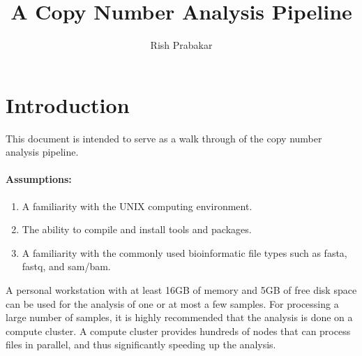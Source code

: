 \documentclass[11pt]{article}
\title{A Copy Number Analysis Pipeline}
\author{Rish Prabakar}
\begin{document}
\maketitle

\section{Introduction}
This document is intended to serve as a walk through of the copy number
analysis pipeline.

\paragraph{Assumptions:}
\begin{enumerate}
  \item A familiarity with the UNIX computing environment.
  \item The ability to compile and install tools and packages.
  \item A familiarity with the commonly used bioinformatic file types such
    as fasta, fastq, and sam/bam.
\end{enumerate}

A personal workstation with at least 16GB of memory and 5GB of free disk
space can be used for the analysis of one or at most a few samples.
%
For processing a large number of samples, it is highly recommended that
the analysis is done on a compute cluster. A compute cluster provides
hundreds of nodes that can process files in parallel, and thus
significantly speeding up the analysis.


\end{document}
